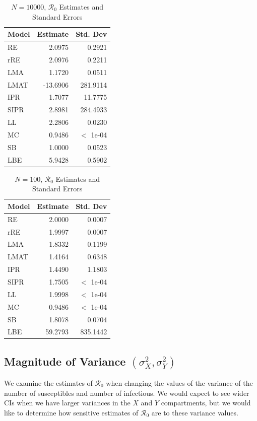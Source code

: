 \documentclass[12pt]{article}
\newcommand{\rr}{\ensuremath{\mathcal{R}_0}}
\begin{document}
\begin{table}[H]
	
	\centering
	\begin{tabular}[t]{l|r|r}
		\hline
		Model & Estimate & Std. Dev\\
		\hline
		RE & 2.0975 & 0.2921\\
		\hline
		rRE & 2.0976 & 0.2211\\
		\hline
		LMA & 1.1720 & 0.0511\\
		\hline
		LMAT & -13.6906 & 281.9114\\
		\hline
		IPR & 1.7077 & 11.7775\\
		\hline
		SIPR & 2.8981 & 284.4933\\
		\hline
		LL & 2.2806 & 0.0230\\
		\hline
		MC & 0.9486 & $<$ 1e-04\\
		\hline
		SB & 1.0000 & 0.0523\\
		\hline
		LBE & 5.9428 & 0.5902\\
		\hline
	\end{tabular}
	\caption{$N = 10000$, $\rr$ Estimates and Standard Errors}
\end{table}

\begin{table}[H]
	
	\centering
	\begin{tabular}[t]{l|r|r}
		\hline
		Model & Estimate & Std. Dev\\
		\hline
		RE & 2.0000 & 0.0007\\
		\hline
		rRE & 1.9997 & 0.0007\\
		\hline
		LMA & 1.8332 & 0.1199\\
		\hline
		LMAT & 1.4164 & 0.6348\\
		\hline
		IPR & 1.4490 & 1.1803\\
		\hline
		SIPR & 1.7505 & $<$ 1e-04\\
		\hline
		LL & 1.9998 & $<$ 1e-04\\
		\hline
		MC & 0.9486 & $<$ 1e-04\\
		\hline
		SB & 1.8078 & 0.0704\\
		\hline
		LBE & 59.2793 & 835.1442\\
		\hline
	\end{tabular}
	\caption{$N = 100$, $\rr$ Estimates and Standard Errors}
\end{table}

\subsection{Magnitude of Variance $(\sigma^2_X, \sigma^2_Y)$}\label{sec:res-var}
We examine the estimates of $\rr$ when changing the values of the variance of the number of susceptibles and number of infectious.  We would expect to see wider CIs when we have larger variances in the $X$ and $Y$ compartments, but we would like to determine how sensitive estimates of $\rr$ are to these variance values.
\end{document}
